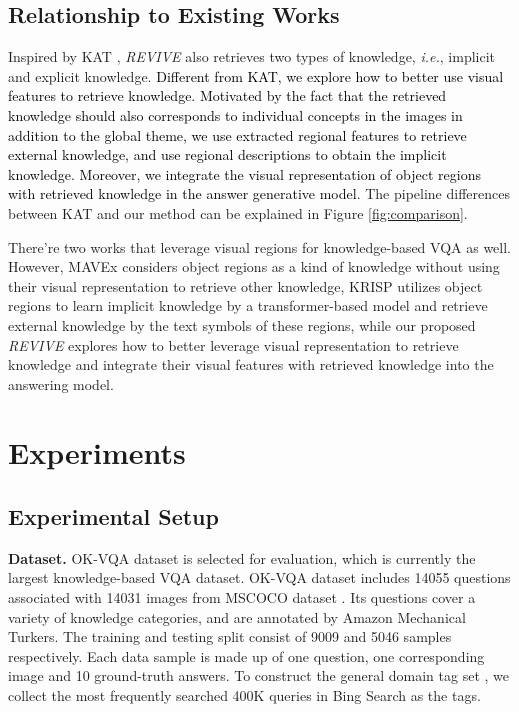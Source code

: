 \documentclass{article}
\begin{document}
\subsection{Relationship to Existing Works}
Inspired by KAT \cite{gui2021kat}, \textit{REVIVE} also retrieves two types of knowledge, \textit{i.e.}, implicit and explicit knowledge. \textcolor{black}{Different from KAT, we explore how to better use visual features to retrieve knowledge. Motivated by the fact that the retrieved knowledge should also corresponds to individual concepts in the images in addition to the global theme, we use extracted regional features to retrieve external knowledge, and use regional descriptions to obtain the implicit knowledge. Moreover, we integrate the visual representation of object regions with retrieved knowledge in the answer generative model}. The pipeline differences between KAT \cite{gui2021kat} and our method can be explained in Figure \ref{fig:comparison}.

There're two works \cite{wu2021multi, marino2021krisp} that leverage visual regions for knowledge-based VQA as well. However, MAVEx \cite{wu2021multi} considers object regions as a kind of knowledge without using their visual representation to retrieve other knowledge, KRISP \cite{marino2021krisp} utilizes object regions to learn implicit knowledge by a transformer-based model and retrieve external knowledge by the text symbols of these regions, while our proposed \textit{REVIVE} explores how to better leverage visual representation to retrieve knowledge and integrate their visual features with retrieved knowledge into the answering model.

\section{Experiments}

\subsection{Experimental Setup}
\label{setup}

\textbf{Dataset. } OK-VQA dataset \cite{marino2019ok} is selected for evaluation, which is currently the largest knowledge-based VQA dataset. OK-VQA dataset includes 14055 questions associated with 14031 images from MSCOCO dataset \cite{lin2014microsoft}. Its questions cover a variety of knowledge categories, and are annotated by Amazon Mechanical Turkers. The training and testing split consist of 9009 and 5046 samples respectively. Each data sample is made up of one question, one corresponding image and 10 ground-truth answers. To construct the general domain tag set , we collect the most frequently searched 400K queries in Bing Search as the tags. 
\end{document}
